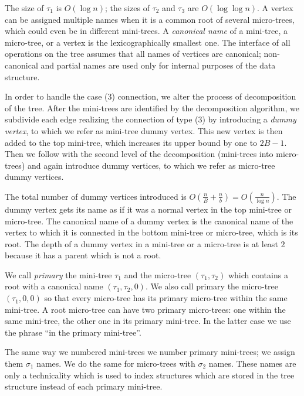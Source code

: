 The size of $\tau_1$ is $O(\log n)$; the sizes of $\tau_2$ and $\tau_3$ are $O(\log \log n)$.
A vertex can be assigned multiple names when it is a common root of several micro-trees, which could even be in different mini-trees.
A \emph{canonical name} of a mini-tree, a micro-tree, or a vertex is the lexicographically smallest one.
The interface of all operations on the tree assumes that all names of vertices are canonical; non-canonical and partial names are used only for internal purposes of the data structure.

In order to handle the case (3) connection, we alter the process of decomposition of the tree.
After the mini-trees are identified by the decomposition algorithm, we subdivide each edge realizing the connection of type (3) by introducing a \emph{dummy vertex}, to which we refer as mini-tree dummy vertex.
This new vertex is then added to the top mini-tree, which increases its upper bound by one to $2 B - 1$.
Then we follow with the second level of the decomposition (mini-trees into micro-trees) and again introduce dummy vertices, to which we refer as micro-tree dummy vertices.

The total number of dummy vertices introduced is $O\left(\frac{n}{B} + \frac{n}{b}\right) = O\left(\frac{n}{\log n}\right)$.
The dummy vertex gets its name as if it was a normal vertex in the top mini-tree or micro-tree.
The canonical name of a dummy vertex is the canonical name of the vertex to which it is connected in the bottom mini-tree or micro-tree, which is its root.
The depth of a dummy vertex in a mini-tree or a micro-tree is at least $2$ because it has a parent which is not a root.

\bigbreak

We call \emph{primary} the mini-tree $\tau_1$ and the micro-tree $(\tau_1, \tau_2)$ which contains a root with a canonical name $(\tau_1, \tau_2, 0)$.
We also call primary the micro-tree $(\tau_1, 0, 0)$ so that every micro-tree has its primary micro-tree within the same mini-tree.
A root micro-tree can have two primary micro-trees: one within the same mini-tree, the other one in its primary mini-tree.
In the latter case we use the phrase ``in the primary mini-tree''.

The same way we numbered mini-trees we number primary mini-trees; we assign them $\sigma_1$ names.
We do the same for micro-trees with $\sigma_2$ names.
These names are only a technicality which is used to index structures which are stored in the tree structure instead of each primary mini-tree.

